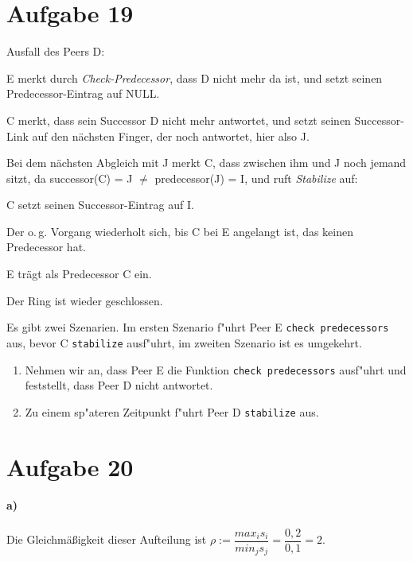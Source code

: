 \documentclass[10pt,a4paper]{article}
\begin{document}
\section*{Aufgabe 19} 
Ausfall des Peers D:
\begin{compactitem} [–]
	\item E merkt durch \textit{Check-Predecessor}, dass D nicht mehr da ist, und setzt seinen Predecessor-Eintrag auf NULL.
	\item C merkt, dass sein Successor D nicht mehr antwortet, und setzt seinen Successor-Link auf den nächsten Finger, der noch antwortet, hier also J.
	\item Bei dem nächsten Abgleich mit J merkt C, dass zwischen ihm und J noch jemand sitzt, da successor(C) = J $\neq$ predecessor(J) = I, und ruft \textit{Stabilize} auf:
	\begin{compactitem}
		\item C setzt seinen Successor-Eintrag auf I.
		\item Der o.\,g. Vorgang wiederholt sich, bis C bei E angelangt ist, das keinen Predecessor hat. 
		\item E trägt als Predecessor C ein.
	\end{compactitem}
	\item Der Ring ist wieder geschlossen.
\end{compactitem}

Es gibt zwei Szenarien.  Im ersten Szenario f"uhrt Peer E \verb!check predecessors! aus, bevor C \verb!stabilize! ausf"uhrt, im zweiten Szenario ist es umgekehrt.

\begin{enumerate}

\item Nehmen wir an, dass Peer E die Funktion \verb!check predecessors! ausf"uhrt und feststellt, dass Peer D nicht antwortet.  
\item Zu einem sp"ateren Zeitpunkt f"uhrt Peer D \verb!stabilize! aus.  
\end{enumerate}

\section*{Aufgabe 20}
\paragraph*{a)} Die Gleichmäßigkeit dieser Aufteilung ist
$ρ:=\dfrac{max_i s_i}{min_j s_j} = \dfrac{0,2}{0,1} = 2$\quad.
\end{document}
